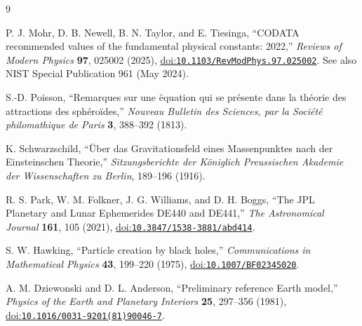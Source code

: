 \documentclass[12pt]{article}
\begin{document}
\begin{thebibliography}{9}
\small
{}
\raggedright
{}

P. J. Mohr, D. B. Newell, B. N. Taylor, and E. Tiesinga,
``CODATA recommended values of the fundamental physical constants: 2022,''
\emph{Reviews of Modern Physics} \textbf{97}, 025002 (2025),
\href{https://doi.org/10.1103/RevModPhys.97.025002}{doi:\nolinkurl{10.1103/RevModPhys.97.025002}}.
See also NIST Special Publication 961 (May 2024).

S.-D. Poisson,
``Remarques sur une \"equation qui se pr\'esente dans la th\'eorie des attractions des sph\'ero\"ides,''
\emph{Nouveau Bulletin des Sciences, par la Soci\'et\'e philomathique de Paris} \textbf{3}, 388--392 (1813).

K. Schwarzschild,
``\"Uber das Gravitationsfeld eines Massenpunktes nach der Einsteinschen Theorie,''
\emph{Sitzungsberichte der K\"oniglich Preussischen Akademie der Wissenschaften zu Berlin}, 189--196 (1916).

R. S. Park, W. M. Folkner, J. G. Williams, and D. H. Boggs,
``The JPL Planetary and Lunar Ephemerides DE440 and DE441,''
\emph{The Astronomical Journal} \textbf{161}, 105 (2021),
\href{https://doi.org/10.3847/1538-3881/abd414}{doi:\nolinkurl{10.3847/1538-3881/abd414}}.

S. W. Hawking,
``Particle creation by black holes,''
\emph{Communications in Mathematical Physics} \textbf{43}, 199--220 (1975),
\href{https://doi.org/10.1007/BF02345020}{doi:\nolinkurl{10.1007/BF02345020}}.

A. M. Dziewonski and D. L. Anderson,
``Preliminary reference Earth model,''
\emph{Physics of the Earth and Planetary Interiors} \textbf{25}, 297--356 (1981),
\href{https://doi.org/10.1016/0031-9201(81)90046-7}{doi:\nolinkurl{10.1016/0031-9201(81)90046-7}}.

\end{thebibliography}
\end{document}
